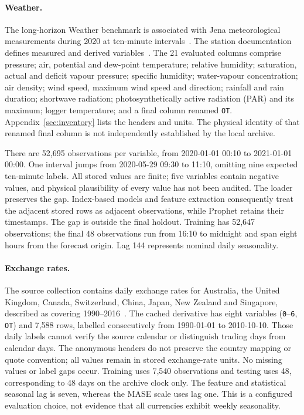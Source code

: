 \paragraph{Weather.}
The long-horizon Weather benchmark is associated with Jena meteorological measurements during 2020 at ten-minute intervals~\cite{autoformer_paper}. The station documentation defines measured and derived variables~\cite{jena_weather}. The 21 evaluated columns comprise pressure; air, potential and dew-point temperature; relative humidity; saturation, actual and deficit vapour pressure; specific humidity; water-vapour concentration; air density; wind speed, maximum wind speed and direction; rainfall and rain duration; shortwave radiation; photosynthetically active radiation (PAR) and its maximum; logger temperature; and a final column renamed \texttt{OT}. Appendix~\ref{sec:inventory} lists the headers and units. The physical identity of that renamed final column is not independently established by the local archive.

There are 52,695 observations per variable, from 2020-01-01 00:10 to 2021-01-01 00:00. One interval jumps from 2020-05-29 09:30 to 11:10, omitting nine expected ten-minute labels. All stored values are finite; five variables contain negative values, and physical plausibility of every value has not been audited. The loader preserves the gap. Index-based models and feature extraction consequently treat the adjacent stored rows as adjacent observations, while Prophet retains their timestamps. The gap is outside the final holdout. Training has 52,647 observations; the final 48 observations run from 16:10 to midnight and span eight hours from the forecast origin. Lag 144 represents nominal daily seasonality.

\paragraph{Exchange rates.}
The source collection contains daily exchange rates for Australia, the United Kingdom, Canada, Switzerland, China, Japan, New Zealand and Singapore, described as covering 1990--2016~\cite{lai_data}. The cached derivative has eight variables (\texttt{0}--\texttt{6}, \texttt{OT}) and 7,588 rows, labelled consecutively from 1990-01-01 to 2010-10-10. Those daily labels cannot verify the source calendar or distinguish trading days from calendar days. The anonymous headers do not preserve the country mapping or quote convention; all values remain in stored exchange-rate units. No missing values or label gaps occur. Training uses 7,540 observations and testing uses 48, corresponding to 48 days on the archive clock only. The feature and statistical seasonal lag is seven, whereas the MASE scale uses lag one. This is a configured evaluation choice, not evidence that all currencies exhibit weekly seasonality.

